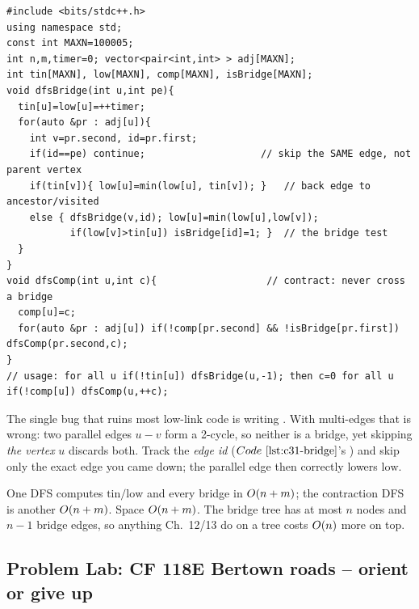 \begin{lstlisting}[caption={Low-link bridges plus 2-edge-connected contraction. One DFS fills tin and low, marks a bridge when low[child] is above tin[parent], then a second pass labels components by skipping bridges. ASCII only, identifiers without underscores}, label={lst:c31-bridge}]
#include <bits/stdc++.h>
using namespace std;
const int MAXN=100005;
int n,m,timer=0; vector<pair<int,int> > adj[MAXN];
int tin[MAXN], low[MAXN], comp[MAXN], isBridge[MAXN];
void dfsBridge(int u,int pe){
  tin[u]=low[u]=++timer;
  for(auto &pr : adj[u]){
    int v=pr.second, id=pr.first;
    if(id==pe) continue;                    // skip the SAME edge, not parent vertex
    if(tin[v]){ low[u]=min(low[u], tin[v]); }   // back edge to ancestor/visited
    else { dfsBridge(v,id); low[u]=min(low[u],low[v]);
           if(low[v]>tin[u]) isBridge[id]=1; }  // the bridge test
  }
}
void dfsComp(int u,int c){                   // contract: never cross a bridge
  comp[u]=c;
  for(auto &pr : adj[u]) if(!comp[pr.second] && !isBridge[pr.first]) dfsComp(pr.second,c);
}
// usage: for all u if(!tin[u]) dfsBridge(u,-1); then c=0 for all u if(!comp[u]) dfsComp(u,++c);
\end{lstlisting}

\begin{insightbox}
The single bug that ruins most low-link code is writing .
With multi-edges that is wrong: two parallel edges \(u\!-\!v\) form a 2-cycle, so
neither is a bridge, yet skipping \emph{the vertex} \(u\) discards both.  Track the
\emph{edge id} (\(\coderef{c31-bridge}\)'s ) and skip only the exact edge
you came down; the parallel edge then correctly lowers \(\mathrm{low}\).
\end{insightbox}

\begin{complexitybox}
One DFS computes \(\mathrm{tin}/\mathrm{low}\) and every bridge in
\(O(n+m)\); the contraction DFS is another \(O(n+m)\).  Space
\(O(n+m)\).  The bridge tree has at most \(n\) nodes and \(n-1\) bridge
edges, so anything Ch.~12/13 do on a tree costs \(O(n)\) more on top.
\end{complexitybox}

\subsection{Problem Lab: CF 118E Bertown roads -- orient or give up}

